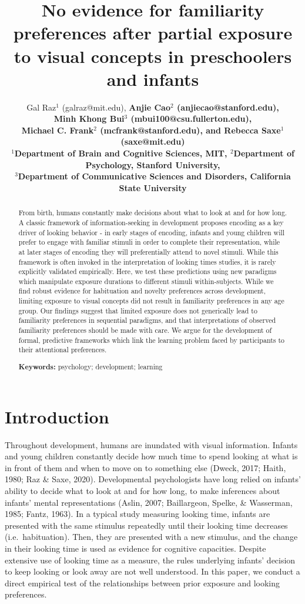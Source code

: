\documentclass[10pt, letterpaper]{article}
\title{No evidence for familiarity preferences after partial exposure to
visual concepts in preschoolers and infants}
\author{Gal Raz$^1$ (galraz@mit.edu), \bf{Anjie Cao$^2$  (anjiecao@stanford.edu)},\\ \bf{Minh Khong Bui$^3$  (mbui100@csu.fullerton.edu)}, \\ \bf{Michael C. Frank$^2$ (mcfrank@stanford.edu)},
 and \bf{Rebecca Saxe$^1$ (saxe@mit.edu)} \\
$^1$Department of Brain and Cognitive Sciences, MIT, $^2$Department of Psychology, Stanford University, \\ $^3$Department of Communicative Sciences and Disorders, California State University \\ }
\begin{document}
\maketitle

\begin{abstract}
From birth, humans constantly make decisions about what to look at and
for how long. A classic framework of information-seeking in development
proposes encoding as a key driver of looking behavior - in early stages
of encoding, infants and young children will prefer to engage with
familiar stimuli in order to complete their representation, while at
later stages of encoding they will preferentially attend to novel
stimuli. While this framework is often invoked in the interpretation of
looking times studies, it is rarely explicitly validated empirically.
Here, we test these predictions using new paradigms which manipulate
exposure durations to different stimuli within-subjects. While we find
robust evidence for habituation and novelty preferences across
development, limiting exposure to visual concepts did not result in
familiarity preferences in any age group. Our findings suggest that
limited exposure does not generically lead to familiarity preferences in
sequential paradigms, and that interpretations of observed familiarity
preferences should be made with care. We argue for the development of
formal, predictive frameworks which link the learning problem faced by
participants to their attentional preferences.

\textbf{Keywords:}
psychology; development; learning
\end{abstract}

\hypertarget{introduction}{%
\section{Introduction}\label{introduction}}

Throughout development, humans are inundated with visual information.
Infants and young children constantly decide how much time to spend
looking at what is in front of them and when to move on to something
else (Dweck, 2017; Haith, 1980; Raz \& Saxe, 2020). Developmental
psychologists have long relied on infants' ability to decide what to
look at and for how long, to make inferences about infants' mental
representations (Aslin, 2007; Baillargeon, Spelke, \& Wasserman, 1985;
Fantz, 1963). In a typical study measuring looking time, infants are
presented with the same stimulus repeatedly until their looking time
decreases (i.e.~habituation). Then, they are presented with a new
stimulus, and the change in their looking time is used as evidence for
cognitive capacities. Despite extensive use of looking time as a
measure, the rules underlying infants' decision to keep looking or look
away are not well understood. In this paper, we conduct a direct
empirical test of the relationships between prior exposure and looking
preferences.
\end{document}
